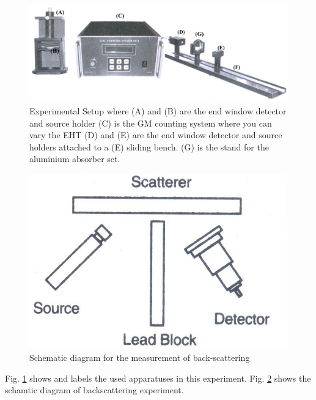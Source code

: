 \begin{figure}
    \centering
    \includegraphics[width=1\columnwidth]{images/t2.jpg}
    \caption{Experimental Setup where (A) and (B) are the end window detector and source holder (C) is the GM counting system where you can vary the EHT (D) and (E) are the end window detector and source holders attached to a (E) sliding bench. (G) is the stand for the aluminium absorber set.}
    \label{t3}
\end{figure}

\begin{figure}
    \centering
    \includegraphics[width=0.7\columnwidth]{images/back.png}
    \caption{Schematic diagram for the measurement of back-scattering}
    \label{t1}
\end{figure}

\noindent Fig. \ref{t3} shows and labels the used apparatuses in this experiment. Fig. \ref{t1} shows the schamtic diagram of backscattering experiment.